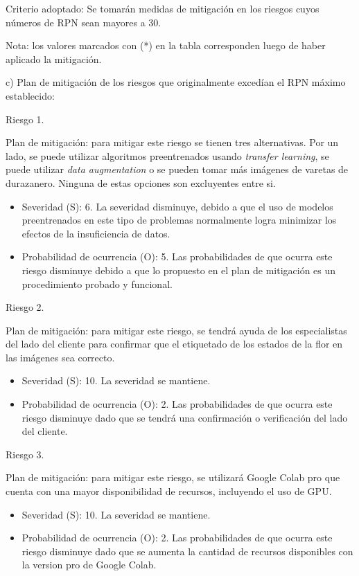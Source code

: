 \documentclass[
11pt, %
]{charter}
\begin{document}
Criterio adoptado: 
Se tomarán medidas de mitigación en los riesgos cuyos números de RPN sean mayores a 30.

Nota: los valores marcados con (*) en la tabla corresponden luego de haber aplicado la mitigación.

c) Plan de mitigación de los riesgos que originalmente excedían el RPN máximo establecido:

Riesgo 1. 

Plan de mitigación: para mitigar este riesgo se tienen tres alternativas. Por un lado, se puede utilizar algoritmos preentrenados usando \textit{transfer learning}, se puede utilizar \textit{data augmentation} o se pueden tomar más imágenes de varetas de durazanero. Ninguna de estas opciones son excluyentes entre si.

\begin{itemize}
\item Severidad (S): 6. La severidad disminuye, debido a que el uso de modelos preentrenados en este tipo de problemas normalmente logra minimizar los efectos de la insuficiencia de datos.

\item Probabilidad de ocurrencia (O): 5. Las probabilidades de que ocurra este riesgo disminuye debido a que lo propuesto en el plan de mitigación es un procedimiento probado y funcional. 
\end{itemize}

Riesgo 2. 

Plan de mitigación: para mitigar este riesgo, se tendrá ayuda de los especialistas del lado del cliente para confirmar que el etiquetado de los estados de la flor en las imágenes sea correcto.

\begin{itemize}
\item Severidad (S): 10. La severidad se mantiene.

\item Probabilidad de ocurrencia (O): 2. Las probabilidades de que ocurra este riesgo disminuye dado que se tendrá una confirmación o verificación del lado del cliente. 
\end{itemize}

Riesgo 3. 

Plan de mitigación: para mitigar este riesgo, se utilizará Google Colab pro que cuenta con una mayor disponibilidad de recursos, incluyendo el uso de GPU.

\begin{itemize}
\item Severidad (S): 10. La severidad se mantiene.

\item Probabilidad de ocurrencia (O): 2. Las probabilidades de que ocurra este riesgo disminuye dado que se aumenta la cantidad de recursos disponibles con la version pro de Google Colab. 
\end{itemize}
\end{document}
